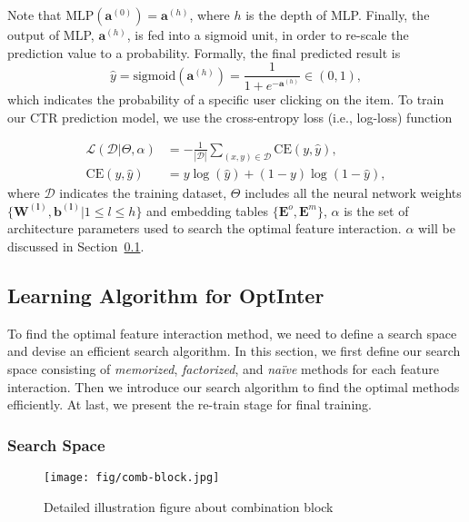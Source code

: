 \documentclass[conference]{IEEEtran}
\begin{document}
Note that $\text{MLP}(\mathbf{a}^{(0)})=\mathbf{a}^{(h)}$, where $h$ is the depth of MLP. Finally, the output of MLP, $\mathbf{a}^{(h)}$, is fed into a sigmoid unit, in order to re-scale the prediction value to a probability. Formally, the final predicted result is 
\begin{equation}
    \hat{y} = \text{sigmoid}(\mathbf{a}^{(h)}) = \frac{1}{1+e^{-\mathbf{a}^{(h)}}} \in (0,1),
    \label{eq:y_hat}
\end{equation}
which indicates the probability of a specific user clicking on the item. To train our CTR prediction model, we use the cross-entropy loss (i.e., log-loss) function

\begin{equation}
\begin{split}
    \mathcal{L}(\mathcal{D}|\Theta, \alpha) &= -\frac{1}{|\mathcal{D}|} \sum_{(x, y) \in \mathcal{D}} \text{CE}(y, \hat{y}), \\
    \text{CE}(y, \hat{y}) &= y \log(\hat{y}) + (1-y) \log(1-\hat{y}),
\end{split}
\label{eq:loss}
\end{equation}
where $\mathcal{D}$ indicates the training dataset, $\Theta$ includes all the neural network weights $\{\mathbf{W^{(l)}}, \mathbf{b^{(l)}} | 1 \le l \le h \}$ and embedding tables $\{\mathbf{E}^o,\mathbf{E}^m\}$, $\alpha$ is the set of architecture parameters used to search the optimal feature interaction. $\alpha$ will be discussed in Section~\ref{sec:learning}. 

\subsection{Learning Algorithm for OptInter}
\label{sec:learning}

To find the optimal feature interaction method, we need to define a search space and devise an efficient search algorithm. In this section, we first define our search space consisting of \emph{memorized}, \emph{factorized}, and \emph{naïve} methods for each feature interaction. Then we introduce our search algorithm to find the optimal methods efficiently. At last, we present the re-train stage for final training.

\subsubsection{Search Space}

\begin{figure}[!htbp]
\centering
\texttt{[image: fig/comb-block.jpg]}
\caption{Detailed illustration figure about combination block}
\label{fig:gate} 
\end{figure}
\end{document}
